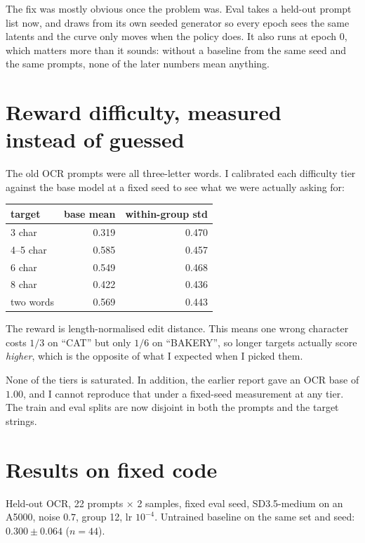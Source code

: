 \documentclass[11pt]{article}
\begin{document}
The fix was mostly obvious once the problem was. Eval takes a held-out prompt list now, and draws from its own seeded generator so every epoch sees the same latents and the curve only moves when the policy does. It also runs at epoch 0, which matters more than it sounds: without a baseline from the same seed and the same prompts, none of the later numbers mean anything.

\section{Reward difficulty, measured instead of guessed}

The old OCR prompts were all three-letter words. I calibrated each difficulty tier against the base model at a fixed seed to see what we were actually asking for:

\begin{center}
\small
\begin{tabular}{@{}lrr@{}}
\toprule
\textbf{target} & \textbf{base mean} & \textbf{within-group std} \\
\midrule
3 char     & 0.319 & 0.470 \\
4--5 char  & 0.585 & 0.457 \\
6 char     & 0.549 & 0.468 \\
8 char     & 0.422 & 0.436 \\
two words  & 0.569 & 0.443 \\
\bottomrule
\end{tabular}
\end{center}

The reward is length-normalised edit distance. This means one wrong character costs $1/3$ on ``CAT'' but only $1/6$ on ``BAKERY'', so longer targets actually score \emph{higher}, which is the opposite of what I expected when I picked them.

None of the tiers is saturated. In addition, the earlier report gave an OCR base of $1.00$, and I cannot reproduce that under a fixed-seed measurement at any tier. The train and eval splits are now disjoint in both the prompts and the target strings.

\section{Results on fixed code}
\label{sec:results}

Held-out OCR, 22 prompts $\times$ 2 samples, fixed eval seed, SD3.5-medium on an A5000, noise $0.7$, group 12, lr $10^{-4}$. Untrained baseline on the same set and seed: $\mathbf{0.300 \pm 0.064}$ ($n=44$).
\end{document}
